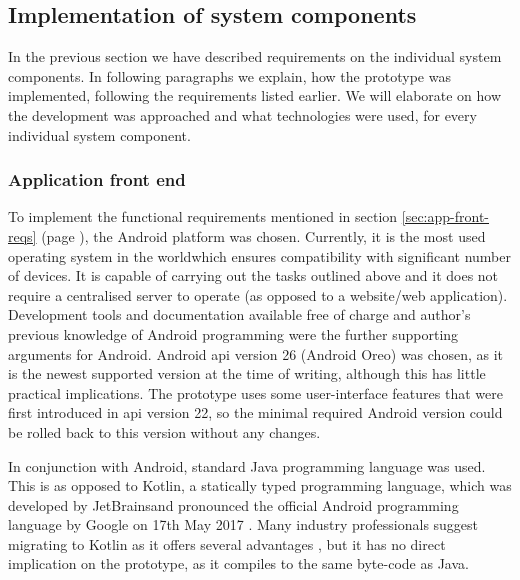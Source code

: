 \subsection{Implementation of system components}

In the previous section we have described requirements on the individual system components. In following paragraphs we explain, how the prototype was implemented, following the requirements listed earlier. We will elaborate on how the development was approached and what technologies were used, for every individual system component. 

\subsubsection{Application front end} 
To implement the functional requirements mentioned in section \ref{sec:app-front-reqs} (page \pageref{sec:app-front-reqs}), the Android platform was chosen. Currently, it is the most used operating system in the world\footnotemark which ensures compatibility with significant number of devices. It is capable of carrying out the tasks outlined above and it does not require a centralised server to operate (as opposed to a website/web application). Development tools and documentation available free of charge and author's previous knowledge of Android programming were the further supporting arguments for Android. Android \acrshort{api} version 26 (Android Oreo) was chosen, as it is the newest supported version at the time of writing, although this has little practical implications. The prototype uses some user-interface features that were first introduced in \acrshort{api} version 22, so the minimal required Android version could be rolled back to this version without any changes.
% 

In conjunction with Android, standard Java programming language was used. This is as opposed to Kotlin, a statically typed programming language, which was developed by JetBrains\footnotemark and pronounced the official Android programming language by Google on 17th May 2017 \cite{Vasic2017MasteringKotlin}. 
% 
% 
Many industry professionals suggest migrating to Kotlin as it offers several advantages \cite{Vasic2017MasteringKotlin} \footnotemark, but it has no direct implication on the prototype, as it compiles to the same byte-code as Java.
% 

